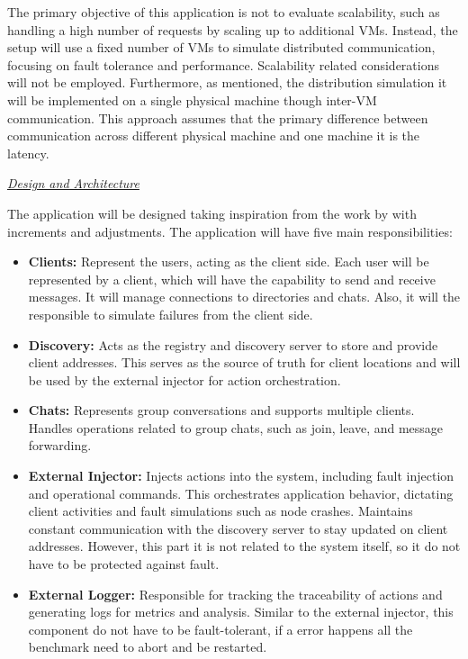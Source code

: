 The primary objective of this application is not to evaluate scalability, such as handling a high number of requests by scaling up to additional \glspl{VM}. Instead, the setup will use a fixed number of \glspl{VM} to simulate distributed communication, focusing on fault tolerance and performance. Scalability related considerations will not be employed. Furthermore, as mentioned, the distribution simulation it will be implemented on a single physical machine though inter-VM communication. This approach assumes that the primary difference between communication across different physical machine and one machine it is the latency.

\textit{\underline{Design and Architecture}}

The application will be designed taking inspiration from the work by \textcite{Randtoul2022} with increments and adjustments. The application will have five main responsibilities:

\begin{itemize}
    \item \textbf{Clients:} Represent the users, acting as the client side. Each user will be represented by a client, which will have the capability to send and receive messages. It will manage connections to directories and chats. Also, it will the responsible to simulate failures from the client side.

    \item \textbf{Discovery:} Acts as the registry and discovery server to store and provide client addresses. This serves as the source of truth for client locations and will be used by the external injector for action orchestration.

    \item \textbf{Chats:} Represents group conversations and supports multiple clients. Handles operations related to group chats, such as join, leave, and message forwarding.

    \item \textbf{External Injector:} Injects actions into the system, including fault injection and operational commands. This orchestrates application behavior, dictating client activities and fault simulations such as node crashes. Maintains constant communication with the discovery server to stay updated on client addresses. However, this part it is not related to the system itself, so it do not have to be protected against fault.

    \item \textbf{External Logger:} Responsible for tracking the traceability of actions and generating logs for metrics and analysis. Similar to the external injector, this component do not have to be fault-tolerant, if a error happens all the benchmark need to abort and be restarted.
\end{itemize}


